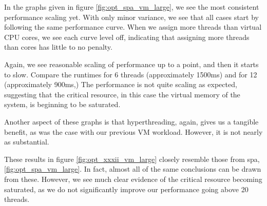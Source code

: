 In the graphs given in figure \ref{fig:opt_spa_vm_large}, we see the most consistent performance scaling yet. With only minor variance, we see that all cases start by following the same performance curve. When we assign more threads than virtual CPU cores, we see each curve level off, indicating that assigning more threads than cores has little to no penalty. 

Again, we see reasonable scaling of performance up to a point, and then it starts to slow. Compare the runtimes for 6 threads (approximately 1500ms) and for 12 (approximately 900ms,) The performance is not quite scaling as expected, suggesting that the critical resource, in this case the virtual memory of the system, is beginning to be saturated.

Another aspect of these graphs is that hyperthreading, again, gives us a tangible benefit, as was the case with our previous VM workload. However, it is not nearly as substantial.



These results in figure \ref{fig:opt_xxxii_vm_large} closely resemble those from spa, \ref{fig:opt_spa_vm_large}. In fact, almost all of the same conclusions can be drawn from these. However, we see much clear evidence of the critical resource becoming saturated, as we do not significantly improve our performance going above 20 threads.



